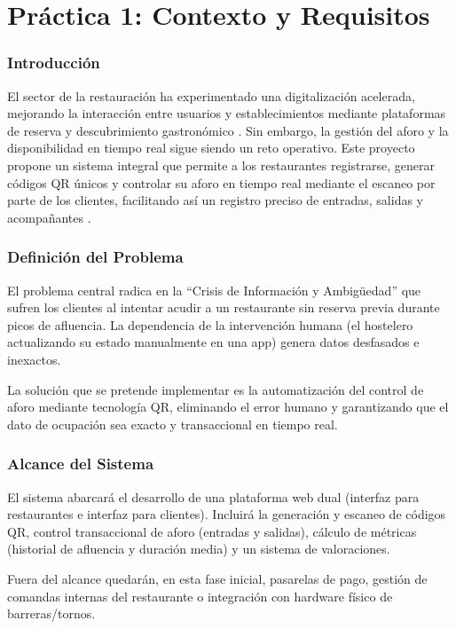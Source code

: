 \part{Práctica 1: Contexto y Requisitos}

\section{Introducción}
El sector de la restauración ha experimentado una digitalización acelerada, mejorando la interacción entre usuarios y establecimientos mediante plataformas de reserva y descubrimiento gastronómico \cite{Gomez2023}. Sin embargo, la gestión del aforo y la disponibilidad en tiempo real sigue siendo un reto operativo. Este proyecto propone un sistema integral que permite a los restaurantes registrarse, generar códigos QR únicos y controlar su aforo en tiempo real mediante el escaneo por parte de los clientes, facilitando así un registro preciso de entradas, salidas y acompañantes \cite{TechRestaurant2022}.

\section{Definición del Problema}
El problema central radica en la ``Crisis de Información y Ambigüedad'' que sufren los clientes al intentar acudir a un restaurante sin reserva previa durante picos de afluencia. La dependencia de la intervención humana (el hostelero actualizando su estado manualmente en una app) genera datos desfasados e inexactos. 

La solución que se pretende implementar es la automatización del control de aforo mediante tecnología QR, eliminando el error humano y garantizando que el dato de ocupación sea exacto y transaccional en tiempo real.

\section{Alcance del Sistema}
El sistema abarcará el desarrollo de una plataforma web dual (interfaz para restaurantes e interfaz para clientes). Incluirá la generación y escaneo de códigos QR, control transaccional de aforo (entradas y salidas), cálculo de métricas (historial de afluencia y duración media) y un sistema de valoraciones. 

Fuera del alcance quedarán, en esta fase inicial, pasarelas de pago, gestión de comandas internas del restaurante o integración con hardware físico de barreras/tornos.

